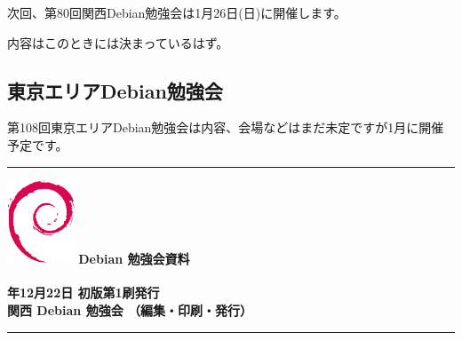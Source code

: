 \documentclass[mingoth,a4paper]{jsarticle}
\newcommand{\debmtgyear}{2013}
\newcommand{\debmtgdate}{22}
\newcommand{\debmtgmonth}{12}
\begin{document}
次回、第80回関西Debian勉強会は1月26日(日)に開催します。

内容はこのときには決まっているはず。

\subsection{東京エリアDebian勉強会}
第108回東京エリアDebian勉強会は内容、会場などはまだ未定ですが1月に開催
予定です。

%
\mbox{}\newpage
\mbox{}\newpage

\printindex

 \begin{minipage}[b]{0.2\hsize}
 \end{minipage}
 \begin{minipage}[b]{0.8\hsize}

 \vspace*{15cm}
 \rule{\hsize}{1mm}
 \vspace{2mm}
 \includegraphics[width=2cm]{image200502/openlogo-nd.eps}
 \noindent \Large \bfseries{Debian 勉強会資料}\\ \\
 \noindent \normalfont \debmtgyear{}年\debmtgmonth{}月\debmtgdate{}日 \hspace{5mm}  初版第1刷発行\\
 \noindent \normalfont 関西 Debian 勉強会 （編集・印刷・発行）\\
 \rule{\hsize}{1mm}
 \end{minipage}
\end{document}
